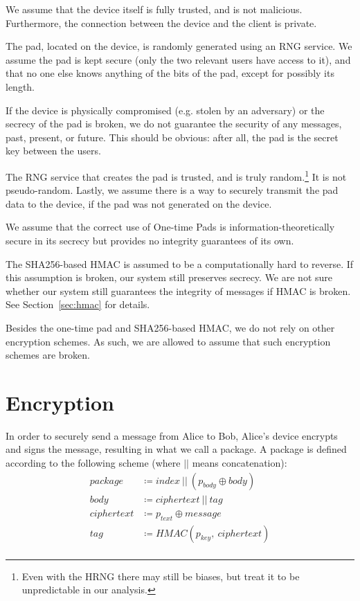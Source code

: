\documentclass[twocolumn]{article}
\begin{document}
We assume that the device itself is fully trusted, and is not malicious. Furthermore, the connection between the device and the client is private.

The pad, located on the device, is randomly generated using an RNG service. We assume the pad is kept secure (only the two relevant users have access to it), and that no one else knows anything of the bits of the pad, except for possibly its length. 

If the device is physically compromised (e.g. stolen by an adversary) or the secrecy of the pad is broken, we do not guarantee the security of any messages, past, present, or future. This should be obvious: after all, the pad is the secret key between the users.

The RNG service that creates the pad is trusted, and is truly random.\footnote{
Even with the HRNG there may still be biases, but treat it to be unpredictable in our analysis.
}
It is not pseudo-random. Lastly, we assume there is a way to securely transmit the pad data to the device, if the pad was not generated on the device.

We assume that the correct use of One-time Pads is information-theoretically secure in its secrecy but provides no integrity guarantees of its own.

The SHA256-based HMAC is assumed to be a computationally hard to reverse. If this assumption is broken, our system still preserves secrecy. We are not sure whether our system still guarantees the integrity of messages if HMAC is broken. See Section~\ref{sec:hmac} for details.

Besides the one-time pad and SHA256-based HMAC, we do not rely on other encryption schemes. As such, we are allowed to assume that such encryption schemes are broken.


\section{Encryption}
\label{sec:encryption}

In order to securely send a message from Alice to Bob, Alice's device encrypts and signs the message, resulting in what we call a package. A package is defined according to the following scheme (where $||$ means concatenation):
\begin{align*}
package &\coloneqq index\ ||\ (p_{body} \oplus body) \\
body &\coloneqq ciphertext\ ||\ tag \\
ciphertext &\coloneqq p_{text} \oplus message \\
tag &\coloneqq HMAC(p_{key},\ ciphertext) \\
\end{align*}
\end{document}
